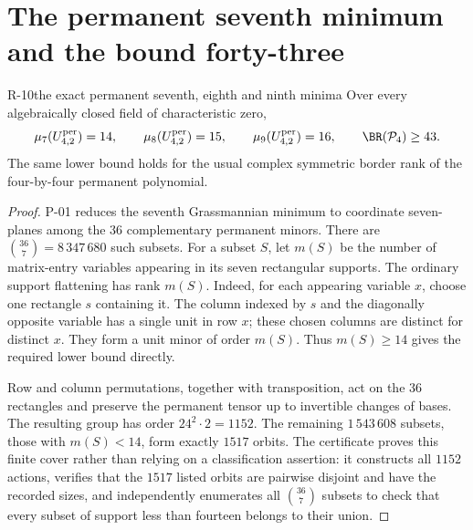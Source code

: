 \section{The permanent seventh minimum and the bound forty-three}

\begin{finding}{R-10}{the exact permanent seventh, eighth and ninth minima}
Over every algebraically closed field of characteristic zero,
\[
 \mu_7(U^{\mathrm{per}}_{4,2})=14,\qquad
 \mu_8(U^{\mathrm{per}}_{4,2})=15,\qquad
 \mu_9(U^{\mathrm{per}}_{4,2})=16,
 \qquad \BR(\mathcal P_4)\geq43.
\]
The same lower bound holds for the usual complex symmetric border
rank of the four-by-four permanent polynomial.
\end{finding}
\begin{proof}
P-01 reduces the seventh Grassmannian minimum to coordinate
seven-planes among the $36$ complementary permanent minors.
There are $\binom{36}{7}=8\,347\,680$ such subsets. For a subset
$S$, let $m(S)$ be the number of matrix-entry variables appearing
in its seven rectangular supports. The ordinary support flattening
has rank $m(S)$. Indeed, for each appearing variable $x$, choose
one rectangle $s$ containing it. The column indexed by $s$ and
the diagonally opposite variable has a single unit in row $x$;
these chosen columns are distinct for distinct $x$. They form
a unit minor of order $m(S)$. Thus $m(S)\geq14$ gives the required
lower bound directly.

Row and column permutations, together with transposition, act on
the $36$ rectangles and preserve the permanent tensor up to
invertible changes of bases. The resulting group has order
$24^2\cdot2=1152$. The remaining $1\,543\,608$ subsets, those with
$m(S)<14$, form exactly $1517$ orbits. The certificate proves this
finite cover rather than relying on a classification assertion:
it constructs all $1152$ actions, verifies that the $1517$ listed
orbits are pairwise disjoint and have the recorded sizes, and
independently enumerates all $\binom{36}{7}$ subsets to check that
every subset of support less than fourteen belongs to their union.


\end{proof}
